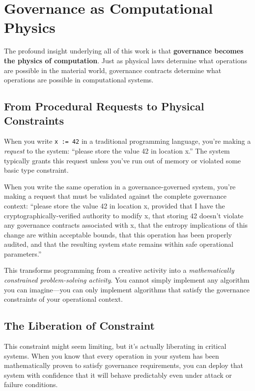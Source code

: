 \section{Governance as Computational Physics}

The profound insight underlying all of this work is that \textbf{governance becomes the physics of computation}. Just as physical laws determine what operations are possible in the material world, governance contracts determine what operations are possible in computational systems.

\subsection{From Procedural Requests to Physical Constraints}

When you write \texttt{x := 42} in a traditional programming language, you're making a \textit{request} to the system: ``please store the value 42 in location x.'' The system typically grants this request unless you've run out of memory or violated some basic type constraint.

When you write the same operation in a governance-governed system, you're making a request that must be validated against the complete governance context: ``please store the value 42 in location x, provided that I have the cryptographically-verified authority to modify x, that storing 42 doesn't violate any governance contracts associated with x, that the entropy implications of this change are within acceptable bounds, that this operation has been properly audited, and that the resulting system state remains within safe operational parameters.''

This transforms programming from a creative activity into a \textit{mathematically constrained problem-solving activity}. You cannot simply implement any algorithm you can imagine—you can only implement algorithms that satisfy the governance constraints of your operational context.

\subsection{The Liberation of Constraint}

This constraint might seem limiting, but it's actually liberating in critical systems. When you know that every operation in your system has been mathematically proven to satisfy governance requirements, you can deploy that system with confidence that it will behave predictably even under attack or failure conditions.

